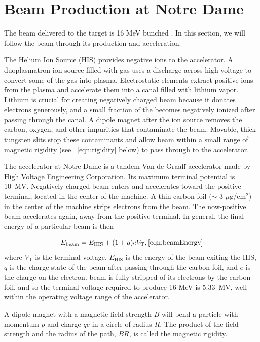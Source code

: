 \section{Beam Production at Notre Dame}
The beam delivered to the target is 16 MeV bunched .  In this section, we will follow the beam through its production and acceleration.

The Helium Ion Source (HIS) provides negative  ions to the accelerator.  A duoplasmatron ion source filled with  gas uses a discharge across high voltage to convert some of the gas into plasma.  Electrostatic elements extract positive  ions from the plasma and accelerate them into a canal filled with lithium vapor.  Lithium is crucial for creating negatively charged beam because it donates electrons generously, and a small fraction of the  becomes negatively ionized after passing through the canal.  A dipole magnet after the ion source removes the carbon, oxygen, and other impurities that contaminate the  beam.  Movable, thick tungsten slits stop these contaminants and allow beam within a small range of magnetic rigidity (see \eqn~\ref{eqn:rigidity} below) to pass through to the accelerator.

The accelerator at Notre Dame is a tandem Van de Graaff accelerator made by High Voltage Engineering Corporation.  Its maximum terminal potential is 10~MV.  Negatively charged beam enters and accelerates toward the positive terminal, located in the center of the machine. A thin carbon foil ($\sim$ 3 $\mu$g/cm$^2$) in the center of the machine strips electrons from the beam.  The now-positive beam accelerates again, away from the positive terminal. In general, the final energy of a particular beam is then

\begin{equation}
E_{\text{beam}} = E_{\text{HIS}} + (1+q)eV_{\text{T}},
\ref{eqn:beamEnergy}
\end{equation}
where $V_{\text{T}}$ is the terminal voltage, $E_{\text{HIS}}$ is the energy of the beam exiting the HIS, $q$ is the charge state of the beam after passing through the carbon foil, and $e$ is the charge on the electron.   beam is fully stripped of its electrons by the carbon foil, and so the terminal voltage required to produce 16 MeV  is 5.33~MV, well within the operating voltage range of the accelerator.    

A dipole magnet with a magnetic field strength $B$ will bend a particle with momentum $p$ and charge $qe$ in a circle of radius $R$.  The product of the field strength and the radius of the path, $BR$, is called the magnetic rigidity.

